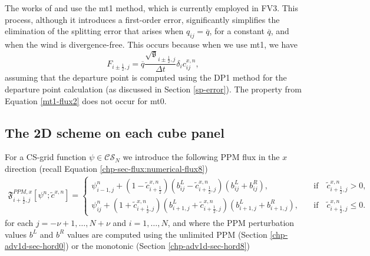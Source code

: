 The works of \citet{lin:2004} and \citet{putman:2007} use the mt1 method, which is currently employed in FV3.
This process, although it introduces a first-order error, 
significantly simplifies the elimination of the splitting error that arises when $q_{ij} = \overline{q}$, for a constant $\overline{q}$, 
and when the wind is divergence-free.
This occurs because when we use mt1, we have
\begin{equation}
	\label{mt1-flux2}
	{F}_{i\pm\frac{1}{2},j} =  \overline{q}\frac{\sqrt{\mathfrak{g}}_{i\pm\frac{1}{2},j}}{\Delta t}
	\delta_i c^{x,n}_{ij},
\end{equation}
assuming that the departure point is computed using the DP1 method for the departure point calculation (as discussed in Section \ref{sp-error}).
The property from Equation \eqref{mt1-flux2} does not occur for mt0.

\subsection{The 2D scheme on each cube panel}
\label{sec-splittingcs}
For a CS-grid function $\psi \in \mathcal{CS}_N$
we introduce the following PPM flux in the $x$ direction (recall Equation \eqref{chp-sec-flux:numerical-flux8})
\begin{align}
	\label{chp5-flux-xdir}
	\mathfrak{F}_{i+\frac{1}{2},j}^{PPM,x} [{{\psi}^n;\tilde{c}^{x,n}}]= %
	\begin{cases}
		{\psi}_{i-1,j}^{n}+(1-\tilde{c}_{i+\frac{1}{2}}^{x,n})
		(b^L_{ij}-\tilde{c}_{i+\frac{1}{2},j}^{x,n})
		(b^L_{ij}+b^R_{ij}),
		\quad &\text{if} \quad \tilde{c}_{i+\frac{1}{2},j}^{x,n}>0,\\
		{\psi}_{ij}^{n}+(1+\tilde{c}_{i+\frac{1}{2},j}^{x,n})
		(b^L_{i+1,j}+\tilde{c}_{i+\frac{1}{2},j}^{x,n})
		(b^L_{i+1,j}+b^R_{i+1,j}),
		\quad &\text{if} \quad \tilde{c}_{i+\frac{1}{2},j}^{x,n}\leq0.
	\end{cases}
\end{align}
for each $j=-\nu+1, \ldots, N+\nu$ and $i=1, \ldots, N$, and
where the PPM perturbation values $b^L$ and $b^R$ values are computed using the unlimited PPM (Section \ref{chp-adv1d-sec-hord0}) or the monotonic (Section \ref{chp-adv1d-sec-hord8})

